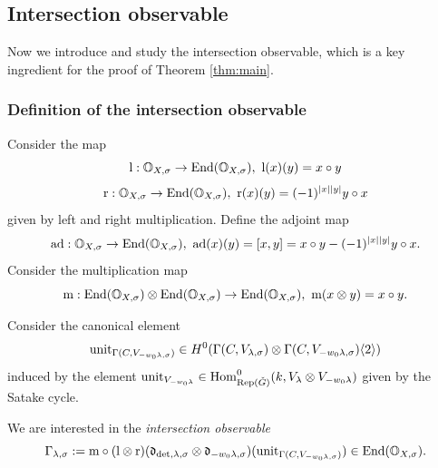\documentclass[reqno]{amsart}
\numberwithin{equation}{section}
\numberwithin{equation}{section}
\begin{document}
\subsection{Intersection observable}\label{sec:intobs}
Now we introduce and study the intersection observable, which is a key ingredient for the proof of Theorem \ref{thm:main}.
\subsubsection{Definition of the intersection observable}
Consider the map \begin{equation}\mathrm{l}: \mathbb{O}_{X,\sigma}\to \operatorname{End}(\mathbb{O}_{X,\sigma}),~\mathrm{l}(x)(y)=x\circ y\end{equation}
\begin{equation}\mathrm{r}:\mathbb{O}_{X,\sigma}\to \operatorname{End}(\mathbb{O}_{X,\sigma}),~\mathrm{r}(x)(y) = (-1)^{|x||y|}y\circ x\end{equation} given by left and right multiplication. Define the adjoint map \begin{equation}
    \mathrm{ad}: \mathbb{O}_{X,\sigma}\to \operatorname{End}(\mathbb{O}_{X,\sigma}),~\mathrm{ad}(x)(y)=[x,y]=x\circ y - (-1)^{|x||y|}y\circ x
.\end{equation}
Consider the multiplication map \begin{equation}
    \mathrm{m}: \operatorname{End}(\mathbb{O}_{X,\sigma})\otimes \operatorname{End}(\mathbb{O}_{X,\sigma})\to \operatorname{End}(\mathbb{O}_{X,\sigma}),~\mathrm{m}(x\otimes y)=x\circ y
.\end{equation}

Consider the canonical element \begin{equation} \mathrm{unit}_{\Gamma(C,V_{-w_0\lambda,\sigma})} \in H^0(\Gamma(C,V_{\lambda,\sigma})\otimes\Gamma(C, V_{-w_0\lambda,\sigma})\langle 2\rangle) \end{equation} induced by the element $\mathrm{unit}_{V_{-w_0\lambda}}\in \operatorname{Hom}^0_{\operatorname{Rep}(\check{G})}(k, V_{\lambda}\otimes V_{-w_0\lambda})$ given by the Satake cycle.

We are interested in the \emph{intersection observable} \begin{equation}
    \Gamma_{\lambda,\sigma}:= \mathrm{m}\circ (\mathrm{l}\otimes\mathrm{r})(\mathfrak{d}_{\det,\lambda,\sigma}\otimes \mathfrak{d}_{-w_0\lambda,\sigma}) (\mathrm{unit}_{\Gamma(C,V_{-w_0\lambda,\sigma})})\in \operatorname{End}(\mathbb{O}_{X,\sigma}).
\end{equation} 
\end{document}
